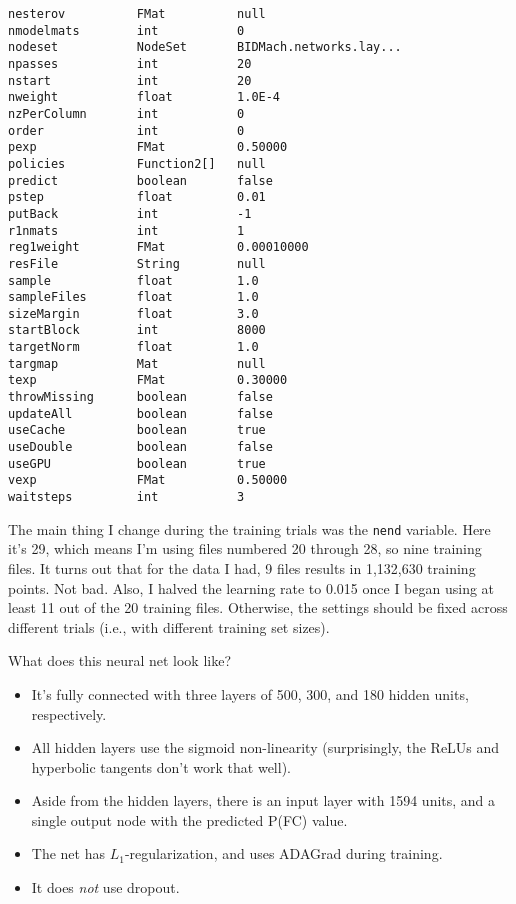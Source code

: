 \documentclass[a4paper, 11pt]{article}
\begin{document}
\begin{verbatim}
nesterov          FMat          null
nmodelmats        int           0
nodeset           NodeSet       BIDMach.networks.lay...
npasses           int           20
nstart            int           20
nweight           float         1.0E-4
nzPerColumn       int           0
order             int           0
pexp              FMat          0.50000
policies          Function2[]   null
predict           boolean       false
pstep             float         0.01
putBack           int           -1
r1nmats           int           1
reg1weight        FMat          0.00010000
resFile           String        null
sample            float         1.0
sampleFiles       float         1.0
sizeMargin        float         3.0
startBlock        int           8000
targetNorm        float         1.0
targmap           Mat           null
texp              FMat          0.30000
throwMissing      boolean       false
updateAll         boolean       false
useCache          boolean       true
useDouble         boolean       false
useGPU            boolean       true
vexp              FMat          0.50000
waitsteps         int           3
\end{verbatim}
\normalsize

The main thing I change during the training trials was the \texttt{nend} variable. Here it's 29,
which means I'm using files numbered 20 through 28, so nine training files. It turns out that for
the data I had, 9 files results in 1,132,630 training points. Not bad. Also, I halved the learning
rate to 0.015 once I began using at least 11 out of the 20 training files. Otherwise, the settings
should be fixed across different trials (i.e., with different training set sizes).

What does this neural net look like?

\begin{itemize}
    \item It's fully connected with three layers of 500, 300, and 180 hidden units, respectively.
    \item All hidden layers use the sigmoid non-linearity (surprisingly, the ReLUs and hyperbolic
    tangents don't work that well).
    \item Aside from the hidden layers, there is an input layer with 1594 units, and a single output
    node with the predicted P(FC) value.
    \item The net has $L_1$-regularization, and uses ADAGrad during training.
    \item It does \emph{not} use dropout.
\end{itemize}
\end{document}
